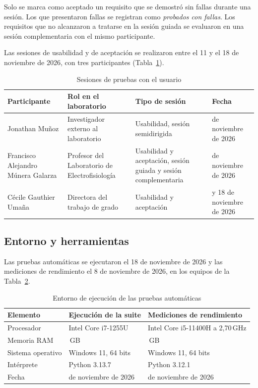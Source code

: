 \documentclass[12pt,letterpaper,oneside]{article}
\begin{document}
Solo se marca como aceptado un requisito que se demostró sin fallas durante una sesión. Los que presentaron fallas se registran como \textit{probados con fallas}. Los requisitos que no alcanzaron a tratarse en la sesión guiada se evaluaron en una sesión complementaria con el mismo participante.

Las sesiones de usabilidad y de aceptación se realizaron entre el 11 y el 18 de noviembre de 2026, con tres participantes (Tabla~\ref{tab:pruebas_sesiones}).

\begin{table}[H]
\centering
\scriptsize
\renewcommand{\arraystretch}{1.3}
\begin{tabularx}{\textwidth}{|>{\raggedright\arraybackslash}X|>{\raggedright\arraybackslash}X|>{\raggedright\arraybackslash}X|>{\raggedright\arraybackslash}X|}
\hline
\textbf{Participante} & \textbf{Rol en el laboratorio} & \textbf{Tipo de sesión} & \textbf{Fecha} \\
\hline
Jonathan Muñoz & Investigador externo al laboratorio & Usabilidad, sesión semidirigida & 11 de noviembre de 2026 \\
\hline
Francisco Alejandro Múnera Galarza & Profesor del Laboratorio de Electrofisiología & Usabilidad y aceptación, sesión guiada y sesión complementaria & 12 de noviembre de 2026 \\
\hline
Cécile Gauthier Umaña & Directora del trabajo de grado & Usabilidad y aceptación & 12 y 18 de noviembre de 2026 \\
\hline
\end{tabularx}
\caption{Sesiones de pruebas con el usuario}
\label{tab:pruebas_sesiones}
\end{table}

\subsection{Entorno y herramientas}

Las pruebas automáticas se ejecutaron el 18 de noviembre de 2026 y las mediciones de rendimiento el 8 de noviembre de 2026, en los equipos de la Tabla~\ref{tab:pruebas_entorno}.

\begin{table}[H]
\centering
\scriptsize
\renewcommand{\arraystretch}{1.3}
\begin{tabularx}{\textwidth}{|l|>{\raggedright\arraybackslash}X|>{\raggedright\arraybackslash}X|}
\hline
\textbf{Elemento} & \textbf{Ejecución de la suite} & \textbf{Mediciones de rendimiento} \\
\hline
Procesador & Intel Core i7-1255U & Intel Core i5-11400H a 2,70\,GHz \\
\hline
Memoria RAM & 24\,GB & 32\,GB \\
\hline
Sistema operativo & Windows 11, 64 bits & Windows 11, 64 bits \\
\hline
Intérprete & Python 3.13.7 & Python 3.12.1 \\
\hline
Fecha & 18 de noviembre de 2026 & 8 de noviembre de 2026 \\
\hline
\end{tabularx}
\caption{Entorno de ejecución de las pruebas automáticas}
\label{tab:pruebas_entorno}
\end{table}
\end{document}

